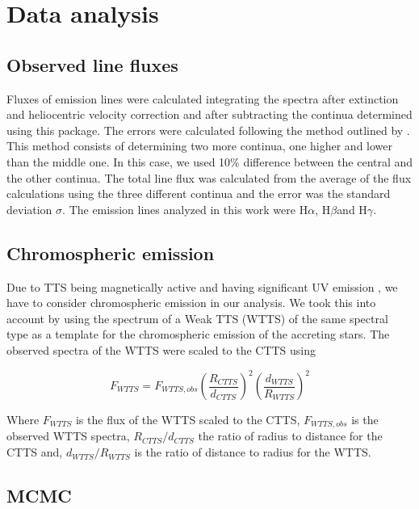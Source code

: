 \documentclass[twocolumn,linenumbers]{aastex631}
\newcommand{\halpha}{H$\alpha$}
\newcommand{\hbeta}{H$\beta$}
\newcommand{\hgamma}{H$\gamma$}
\begin{document}
\section{Data analysis}

\subsection{Observed line fluxes}

Fluxes of emission lines were calculated integrating the spectra after extinction and heliocentric velocity correction and after subtracting the continua determined using this package. The errors were calculated following the method outlined by \citet{alcala2014}. This method consists of determining two more continua, one higher and lower than the middle one. In this case, we used 10\% difference between the central and the other continua. The total line flux was calculated from the average of the flux calculations using the three different continua and the error was the standard deviation $\sigma$. The emission lines analyzed in this work were \halpha, \hbeta and \hgamma.

\subsection{Chromospheric emission}

Due to TTS being magnetically active and having significant UV emission \citep{ingleby2013}, we have to consider chromospheric emission in our analysis. We took this into account by using the spectrum of a Weak TTS (WTTS) of the same spectral type as a template for the chromospheric emission of the accreting stars. The observed spectra of the WTTS were scaled to the CTTS using

\begin{equation}
    F_{WTTS} =  F_{WTTS,obs} \left(\frac{R_{CTTS}}{d_{CTTS}}\right)^2 \left(\frac{d_{WTTS}}{R_{WTTS}}\right)^2
\end{equation}

Where $F_{WTTS}$ is the flux of the WTTS scaled to the CTTS, $F_{WTTS,obs}$ is the observed WTTS spectra, $R_{CTTS}/d_{CTTS}$ the ratio of radius to distance for the CTTS and, $d_{WTTS}/R_{WTTS}$ is the ratio of distance to radius for the WTTS.

\subsection{MCMC}
\end{document}
